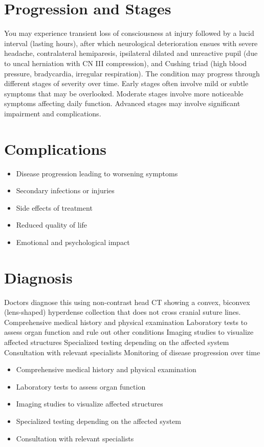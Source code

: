 \section{Progression and Stages}
You may experience transient loss of consciousness at injury followed by a lucid interval (lasting hours), after which neurological deterioration ensues with severe headache, contralateral hemiparesis, ipsilateral dilated and unreactive pupil (due to uncal herniation with CN III compression), and Cushing triad (high blood pressure, bradycardia, irregular respiration). The condition may progress through different stages of severity over time. Early stages often involve mild or subtle symptoms that may be overlooked. Moderate stages involve more noticeable symptoms affecting daily function. Advanced stages may involve significant impairment and complications.
\section{Complications}
\begin{itemize}[noitemsep]
  \item Disease progression leading to worsening symptoms
  \item Secondary infections or injuries
  \item Side effects of treatment
  \item Reduced quality of life
  \item Emotional and psychological impact
\end{itemize}
\section{Diagnosis}
Doctors diagnose this using non-contrast head CT showing a convex, biconvex (lens-shaped) hyperdense collection that does not cross cranial suture lines. Comprehensive medical history and physical examination Laboratory tests to assess organ function and rule out other conditions Imaging studies to visualize affected structures Specialized testing depending on the affected system Consultation with relevant specialists Monitoring of disease progression over time

\begin{itemize}[noitemsep]
  \item Comprehensive medical history and physical examination
  \item Laboratory tests to assess organ function
  \item Imaging studies to visualize affected structures
  \item Specialized testing depending on the affected system
  \item Consultation with relevant specialists
\end{itemize}
